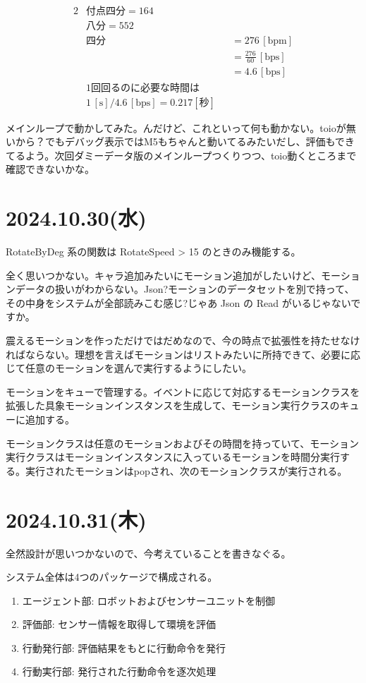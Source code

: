 \documentclass[fleqn,twocolumn]{mynote}
\begin{document}
  \begin{alignat*}{2}
    & 付点四分 = 164 \\
    & 八分 = 552 \\
    & 四分 &&= 276 \, [\text{bpm}] \\
    & &&= \frac{276}{60} \, [\text{bps}] \\
    & &&= 4.6 \, [\text{bps}] \\
    & 1\text{回回るのに必要な時間は} \\
    & 1 \, [\text{s}] / 4.6 \, [\text{bps}] = 0.217[\text{秒}]
  \end{alignat*}

  メインループで動かしてみた。んだけど、これといって何も動かない。toioが無いから？でもデバッグ表示ではM5もちゃんと動いてるみたいだし、評価もできてるよう。次回ダミーデータ版のメインループつくりつつ、toio動くところまで確認できないかな。

  \section*{2024.10.30(水)}
  RotateByDeg 系の関数は RotateSpeed > 15 のときのみ機能する。

  全く思いつかない。キャラ追加みたいにモーション追加がしたいけど、モーションデータの扱いがわからない。Json?モーションのデータセットを別で持って、その中身をシステムが全部読みこむ感じ?じゃあ
  Json の Read がいるじゃないですか。

  震えるモーションを作っただけではだめなので、今の時点で拡張性を持たせなければならない。理想を言えばモーションはリストみたいに所持できて、必要に応じて任意のモーションを選んで実行するようにしたい。

  モーションをキューで管理する。イベントに応じて対応するモーションクラスを拡張した具象モーションインスタンスを生成して、モーション実行クラスのキューに追加する。

  モーションクラスは任意のモーションおよびその時間を持っていて、モーション実行クラスはモーションインスタンスに入っているモーションを時間分実行する。実行されたモーションはpopされ、次のモーションクラスが実行される。

  \section*{2024.10.31(木)}
  全然設計が思いつかないので、今考えていることを書きなぐる。

  システム全体は4つのパッケージで構成される。

  \begin{enumerate}
    \item エージェント部: ロボットおよびセンサーユニットを制御
    \item 評価部: センサー情報を取得して環境を評価
    \item 行動発行部: 評価結果をもとに行動命令を発行
    \item 行動実行部: 発行された行動命令を逐次処理
  \end{enumerate}
\end{document}
